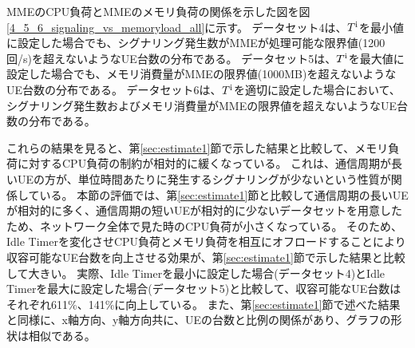 \documentclass[a4j]{ujarticle}
\begin{document}
%
%



MMEのCPU負荷とMMEのメモリ負荷の関係を示した図を図\ref{4_5_6_signaling_vs_memoryload_all}に示す。
データセット4は、$T^{\rm i}$を最小値に設定した場合でも、シグナリング発生数がMMEが処理可能な限界値(1200回/s)を超えないようなUE台数の分布である。
データセット5は、$T^{\rm i}$を最大値に設定した場合でも、メモリ消費量がMMEの限界値(1000MB)を超えないようなUE台数の分布である。
データセット6は、$T^{\rm i}$を適切に設定した場合において、シグナリング発生数およびメモリ消費量がMMEの限界値を超えないようなUE台数の分布である。



これらの結果を見ると、第\ref{sec:estimate1}節で示した結果と比較して、メモリ負荷に対するCPU負荷の制約が相対的に緩くなっている。
これは、通信周期が長いUEの方が、単位時間あたりに発生するシグナリングが少ないという性質が関係している。
本節の評価では、第\ref{sec:estimate1}節と比較して通信周期の長いUEが相対的に多く、通信周期の短いUEが相対的に少ないデータセットを用意したため、ネットワーク全体で見た時のCPU負荷が小さくなっている。
そのため、Idle Timerを変化させCPU負荷とメモリ負荷を相互にオフロードすることにより収容可能なUE台数を向上させる効果が、第\ref{sec:estimate1}節で示した結果と比較して大きい。
実際、Idle Timerを最小に設定した場合(データセット4)とIdle Timerを最大に設定した場合(データセット5)と比較して、収容可能なUE台数はそれぞれ611\%、141\%に向上している。
また、第\ref{sec:estimate1}節で述べた結果と同様に、x軸方向、y軸方向共に、UEの台数と比例の関係があり、グラフの形状は相似である。
\end{document}
